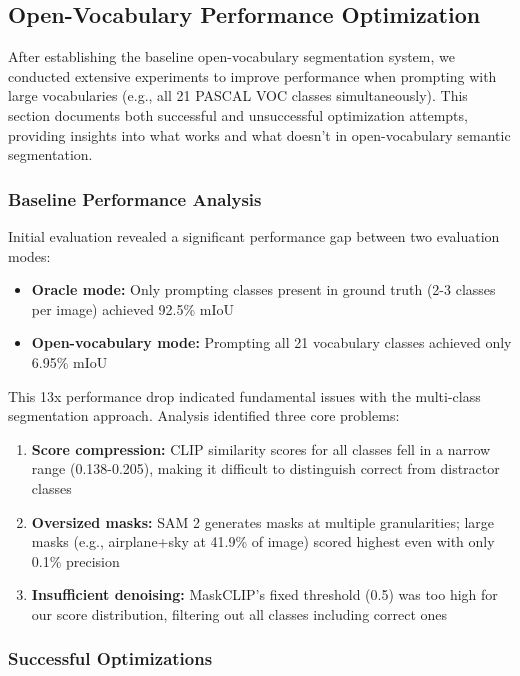 \subsection{Open-Vocabulary Performance Optimization}

After establishing the baseline open-vocabulary segmentation system, we conducted extensive experiments to improve performance when prompting with large vocabularies (e.g., all 21 PASCAL VOC classes simultaneously). This section documents both successful and unsuccessful optimization attempts, providing insights into what works and what doesn't in open-vocabulary semantic segmentation.

\subsubsection{Baseline Performance Analysis}

Initial evaluation revealed a significant performance gap between two evaluation modes:

\begin{itemize}
    \item \textbf{Oracle mode:} Only prompting classes present in ground truth (2-3 classes per image) achieved 92.5\% mIoU
    \item \textbf{Open-vocabulary mode:} Prompting all 21 vocabulary classes achieved only 6.95\% mIoU
\end{itemize}

This 13x performance drop indicated fundamental issues with the multi-class segmentation approach. Analysis identified three core problems:

\begin{enumerate}
    \item \textbf{Score compression:} CLIP similarity scores for all classes fell in a narrow range (0.138-0.205), making it difficult to distinguish correct from distractor classes
    \item \textbf{Oversized masks:} SAM 2 generates masks at multiple granularities; large masks (e.g., airplane+sky at 41.9\% of image) scored highest even with only 0.1\% precision
    \item \textbf{Insufficient denoising:} MaskCLIP's fixed threshold (0.5) was too high for our score distribution, filtering out all classes including correct ones
\end{enumerate}

\subsubsection{Successful Optimizations}

